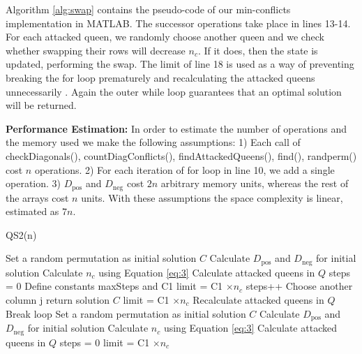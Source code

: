 Algorithm \ref{alg:swap} contains the pseudo-code of our min-conflicts implementation in MATLAB. The successor operations take place in lines 13-14. For each attacked queen, we randomly choose another queen and we check whether swapping their rows will decrease $n_c$. If it does, then the state is updated, performing the swap. The limit of line 18 is used as a way of preventing breaking the for loop prematurely and recalculating the attacked queens unnecessarily \citep{sosic91}. Again the outer while loop guarantees that an optimal solution will be returned.

\textbf{Performance Estimation:} In order to estimate the number of operations and the memory used we make the following assumptions: 1) Each call of checkDiagonals(), countDiagConflicts(), findAttackedQueens(), find(), randperm() cost $n$ operations. 2) For each iteration of for loop in line 10, we add a single operation. 3) $D_{\text{pos}}$ and $D_{\text{neg}}$ cost $2n$ arbitrary memory units, whereas the rest of the arrays cost $n$ units. With these assumptions the space complexity is linear,  estimated as $7n$.

\begin{algorithm}
\caption{QS2(n)}\label{alg:swap}
\begin{algorithmic}[1]
\State Set a random permutation as initial solution $C$
\State Calculate $D_{\text{pos}}$ and $D_{\text{neg}}$ for initial solution
\State Calculate $n_c$ using Equation \ref{eq:3}
\State Calculate attacked queens in $Q$
\State steps = 0
\State Define constants maxSteps and C1
\State limit = C1 $\times n_c$ 
\State steps++
\State Choose another column j
\State return solution $C$
\Else
{}
\State limit = C1 $\times n_c$ 
\State Recalculate attacked queens in $Q$
\State Break loop
\EndIf
\EndIf
\EndIf
\EndFor
\EndWhile
\State Set a random permutation as initial solution $C$
\State Calculate $D_{\text{pos}}$ and $D_{\text{neg}}$ for initial solution
\State Calculate $n_c$ using Equation \ref{eq:3}
\State Calculate attacked queens in $Q$
\State steps = 0
\State limit = C1 $\times n_c$ 
\EndWhile
\end{algorithmic}
\end{algorithm}
















